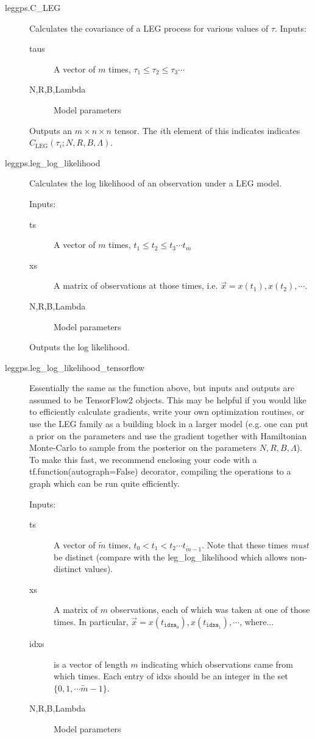 \documentclass{article}
\theoremstyle{definition}
\newcommand{\LEG}{\mathrm{LEG}}
\begin{document}
\begin{description}
    \item[leggps.C\_LEG] Calculates the covariance of a LEG process for various values of $\tau$.
        Inputs:
        \begin{description}
            \item[taus] A vector of $m$ times, $\tau_1 \leq \tau_2 \leq \tau_3 \cdots$
            \item[N,R,B,Lambda] Model parameters
        \end{description} 

        Outputs an $m \times n \times n$ tensor.  The $i$th element of this indicates indicates $C_\LEG(\tau_i;N,R,B,\Lambda)$.


    \item[leggps.leg\_log\_likelihood] Calculates the log likelihood of an observation under a LEG model.

        Inputs:
        \begin{description}
            \item[ts] A vector of $m$ times, $t_1 \leq t_2 \leq t_3 \cdots t_m$
            \item[xs] A matrix of observations at those times, i.e. $\vec x = x(t_1),x(t_2),\cdots$.  
            \item[N,R,B,Lambda] Model parameters
        \end{description} 

        Outputs the log likelihood.
        
    \item[leggps.leg\_log\_likelihood\_tensorflow] Essentially the  same as the function above, but inputs and outputs are assumed to be TensorFlow2 objects.  This may be helpful if you would like to efficiently calculate gradients, write your own optimization routines, or use the LEG family as a building block in a larger model (e.g. one can put a prior on the parameters and use the gradient together with Hamiltonian Monte-Carlo to sample from the posterior on the parameters $N,R,B,\Lambda$).  To make this fast, we recommend enclosing your code with a tf.function(autograph=False) decorator, compiling the operations to a graph which can be run quite efficiently.  
    
    Inputs:
    \begin{description}
        \item[ts] A vector of $\tilde m$ times, $t_0 < t_1 < t_2 \cdots t_{\tilde m-1}$.  Note that these times \emph{must} be distinct (compare with the leg\_log\_likelihood which allows non-distinct values).  
        \item[xs] A matrix of $m$ observations, each of which was taken at one of those times.  In particular, $\vec x = x(t_{\mathtt{idxs}_0}),x(t_{\mathtt{idxs}_1}),\cdots$, where...
        \item[idxs] is a vector of length $m$ indicating which observations came from which times.  Each entry of idxs should be an integer in the set $\{0,1,\cdots \tilde m-1\}$.
        \item[N,R,B,Lambda] Model parameters
    \end{description} 
    

\end{description}
\end{document}
